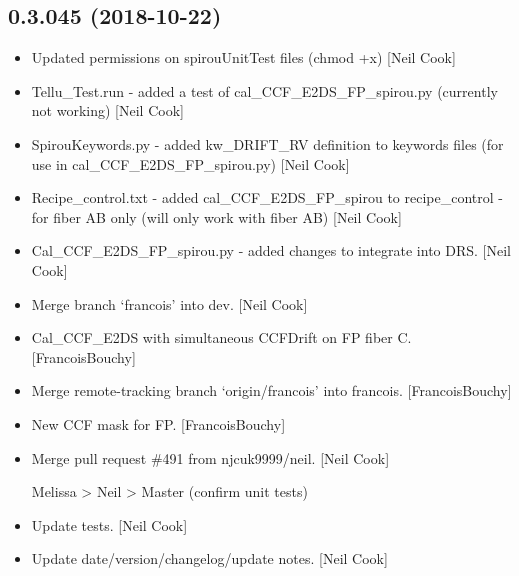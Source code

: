 \documentclass[a4paper,10pt,english]{report}
\begin{document}
\subsection{0.3.045 (2018-10-22)}
\label{\detokenize{misc/changelog:id285}}\begin{itemize}
\item {} 
Updated permissions on spirouUnitTest files (chmod +x) {[}Neil Cook{]}

\item {} 
Tellu\_Test.run - added a test of cal\_CCF\_E2DS\_FP\_spirou.py (currently
not working) {[}Neil Cook{]}

\item {} 
SpirouKeywords.py - added kw\_DRIFT\_RV definition to keywords files
(for use in cal\_CCF\_E2DS\_FP\_spirou.py) {[}Neil Cook{]}

\item {} 
Recipe\_control.txt - added cal\_CCF\_E2DS\_FP\_spirou to recipe\_control -
for fiber AB only (will only work with fiber AB) {[}Neil Cook{]}

\item {} 
Cal\_CCF\_E2DS\_FP\_spirou.py - added changes to integrate into DRS. {[}Neil
Cook{]}

\item {} 
Merge branch ‘francois’ into dev. {[}Neil Cook{]}

\item {} 
Cal\_CCF\_E2DS with simultaneous CCFDrift on FP fiber C.
{[}FrancoisBouchy{]}

\item {} 
Merge remote-tracking branch ‘origin/francois’ into francois.
{[}FrancoisBouchy{]}

\item {} 
New CCF mask for FP. {[}FrancoisBouchy{]}

\item {} 
Merge pull request \#491 from njcuk9999/neil. {[}Neil Cook{]}

Melissa \textendash{}\textgreater{} Neil \textendash{}\textgreater{} Master (confirm unit tests)

\item {} 
Update tests. {[}Neil Cook{]}

\item {} 
Update date/version/changelog/update notes. {[}Neil Cook{]}

\end{itemize}
\end{document}
